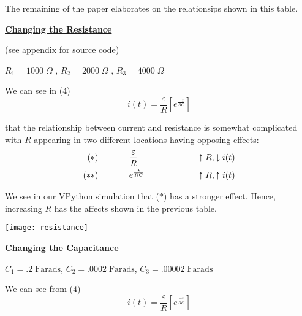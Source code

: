 \documentclass[11pt]{article}
\begin{document}
\noindent The remaining of the paper elaborates on the relationsips shown in this table. 


\newpage

\begin{center}
{\bf\underline{Changing the Resistance}}

(see appendix for source code)
\end{center}

\begin{center}
$R_1=1000\;\Omega$ , $R_2=2000\;\Omega$ , $R_3=4000\;\Omega$
\end{center}
\vspace{.1in}

\noindent We can see in (4) 
\[
i(t)=\frac{\varepsilon}{R}\left[e^{\frac{-t}{RC}}\right]
\]
\vspace{.1in}

\noindent that the relationship between current and resistance is somewhat complicated with $R$ appearing in two different locations having opposing effects:
\begin{align*}
(*)	& \hspace{.5in}\frac{\varepsilon}{R}		&& \hspace{.7in}\uparrow R, \downarrow i(t) \\
(**)	& \hspace{.5in}e^{\frac{t}{RC}} 			&& \hspace{.7in}\uparrow R, \uparrow i(t)	 
\end{align*} 

\vspace{.1in}

\noindent We see in our VPython simulation that ($*$) has a stronger effect. Hence, increasing $R$ has the affects shown in the previous table. 
\vspace{.4in}

\begin{center}
\texttt{[image: resistance]}
\end{center}

\newpage
\begin{center}
{\bf\underline{Changing the Capacitance}}
\end{center}
\begin{center}
$C_1=.2\;\text{Farads}$, $C_2=.0002\;\text{Farads}$, $C_3=.00002\;\text{Farads}$
\end{center} 
\vspace{.1in}

\noindent We can see from (4) 
\[
i(t)=\frac{\varepsilon}{R}\left[e^{\frac{-t}{RC}}\right]
\]
\end{document}
